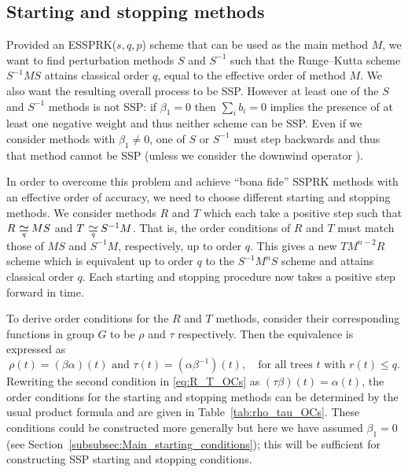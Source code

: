 \subsection{Starting and stopping methods}\label{subsec:starting_stopping}
Provided an ESSPRK($s,q,p$) scheme that can be used as the main 
method $M$, we want to find perturbation methods $S$ and $S^{-1}$ such that the 
Runge--Kutta scheme $S^{-1}MS$ attains classical order $q$, equal to the 
effective order of method $M$.
We also want the resulting overall process to be SSP.
However at least one of the $S$ and $S^{-1}$ methods is not SSP:
if $\beta_1 = 0$ then $\sum_i b_i = 0$ implies the presence of at
least one negative weight and thus neither scheme can be SSP.
Even if we consider methods with $\beta_1 \neq 0$, one of $S$ or
$S^{-1}$ must step backwards and thus that method cannot be SSP
(unless we consider the downwind operator
\cite{Ruuth2004,Gottlieb/Ruuth:SSPfastdownwind,Ketcheson:2011:downwind}).

In order to overcome this problem and achieve ``bona fide''
SSPRK methods with an effective order of accuracy, we need to choose different starting and stopping methods. 
We consider methods $R$ and $T$ which each take a positive step such that 
$R \equival{q} MS$ and $T \equival{q} S^{-1}M$.
That is, the order conditions of $R$ and $T$ must match those of
$MS$ and $S^{-1}M$, respectively, up to order $q$.
This gives a new $TM^{n-2}R$ scheme which is equivalent up to order $q$ 
to the $S^{-1}M^nS$ scheme and attains classical order $q$.
Each starting and stopping procedure now takes a positive step forward
in time.

To derive order conditions for the $R$ and $T$ methods, consider their
corresponding functions in group $G$ to be $\rho$ and $\tau$
respectively.
Then the equivalence is expressed as
\begin{equation} \label{eq:R_T_OCs}
    \rho(t) = (\beta\alpha)(t) \text{ and } \tau(t) = (\alpha\beta^{-1})(t), \quad \text{for all 
    trees $t$ with $r(t) \leq q$.}
\end{equation}
Rewriting the second condition in \eqref{eq:R_T_OCs} as 
$(\tau\beta)(t) = \alpha(t)$, the order conditions for the starting and stopping 
methods can be determined by the usual product formula and are given in Table~\ref{tab:rho_tau_OCs}.
These conditions could be constructed more generally but here we have
assumed $\beta_1=0$ (see Section~\ref{subsubsec:Main_starting_conditions}); this
will be sufficient for constructing SSP starting and stopping
conditions.


